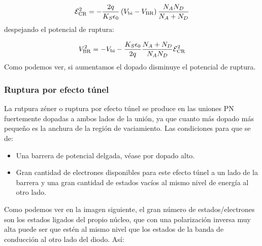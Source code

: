 \begin{equation}
  \mathcal{E}_{\text{CR}}^2  = - \frac{2q}{K_S\epsilon_0} \left( V_{\text{bi}}-V_{\text{BR}} \right) \frac{N_AN_D}{N_A+N_D}
\end{equation}
despejando el potencial de ruptura:

\begin{equation}
    V_{\text{BR}}^2  = -V_{\text{bi}} - \frac{K_S\epsilon_0}{2q} \frac{N_A+N_D}{N_AN_D} \mathcal{E}_{\text{CR}}^2
  \end{equation}
Como podemos ver, si aumentamos el dopado disminuye el potencial de ruptura. 

\subsubsection{Ruptura por efecto túnel}

La rutpura zéner o ruptura por efecto túnel se produce en las uniones PN fuertemente dopadas a ambos lados de la unión, ya que cuanto más dopado más pequeño es la anchura de la región de vaciamiento. Las condiciones para que se de: 

\begin{itemize}
    \item Una barrera de potencial delgada, véase por dopado alto. 
    \item Gran cantidad de electrones disponibles para este efecto túnel a un lado de la barrera y una gran cantidad de estados vacíos al mismo nivel de energía al otro lado. 
\end{itemize}
Como podemos ver en la imagen siguiente, el gran número de estados/electrones son los estados ligados del propio núcleo, que con una polarización inversa muy alta puede ser que estén al mismo nivel que los estados de la banda de conducción al otro lado del diodo. Así: 

